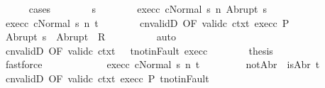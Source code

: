 \begin{isabellebody}
\ \ \ \ \isamarkupfalse%
\ {\isacharparenleft}cases{\isacharparenright}\isanewline
\ \ \ \ \ \ \isamarkupfalse%
\ s{\isacharprime}\isanewline
\ \ \ \ \ \ \isamarkupfalse%
\ exec{\isacharunderscore}c{}{\isacharcolon}\ {\isachardoublequoteopen}{\isasymGamma}{\isasymturnstile}{\isasymlangle}cNormal\ s{\isasymrangle}\ {\isacharequal}n{\isasymRightarrow}\ Abrupt\ s{\isacharprime}{\isachardoublequoteclose}\ \isanewline
\ \ \ \ \ \ \isamarkupfalse%
\ exec{\isacharunderscore}c{}{\isacharcolon}\ {\isachardoublequoteopen}{\isasymGamma}{\isasymturnstile}{\isasymlangle}cNormal\ s{\isacharprime}{\isasymrangle}\ {\isacharequal}n{\isasymRightarrow}\ t{\isachardoublequoteclose}\isanewline
\ \ \ \ \ \ \isamarkupfalse%
\ cnvalidD\ {\isacharbrackleft}OF\ valid{\isacharunderscore}c{}\ ctxt\ exec{\isacharunderscore}c{}\ P\ {\isacharbrackright}\ \isanewline
\ \ \ \ \ \ \isamarkupfalse%
\ {\isachardoublequoteopen}Abrupt\ s{\isacharprime}\ {\isasymin}\ Abrupt\ {\isacharbackquote}\ R{\isachardoublequoteclose}\isanewline
\ \ \ \ \ \ \ \ \isamarkupfalse%
\ auto\isanewline
\ \ \ \ \ \ \isamarkupfalse%
\ cnvalidD\ {\isacharbrackleft}OF\ valid{\isacharunderscore}c{}\ ctxt\ {\isacharunderscore}\ {\isacharunderscore}\ t{\isacharunderscore}notin{\isacharunderscore}Fault{\isacharbrackright}\ exec{\isacharunderscore}c{}\isanewline
\ \ \ \ \ \ \isamarkupfalse%
\ {\isacharquery}thesis\isanewline
\ \ \ \ \ \ \ \ \isamarkupfalse%
\ fastforce\isanewline
\ \ \ \ \isamarkupfalse%
\isanewline
\ \ \ \ \ \ \isamarkupfalse%
\ exec{\isacharunderscore}c{}{\isacharcolon}\ {\isachardoublequoteopen}{\isasymGamma}{\isasymturnstile}{\isasymlangle}cNormal\ s{\isasymrangle}\ {\isacharequal}n{\isasymRightarrow}\ t{\isachardoublequoteclose}\ \isanewline
\ \ \ \ \ \ \isamarkupfalse%
\ notAbr{\isacharcolon}\ {\isachardoublequoteopen}{\isasymnot}\ isAbr\ t{\isachardoublequoteclose}\isanewline
\ \ \ \ \ \ \isamarkupfalse%
\ cnvalidD\ {\isacharbrackleft}OF\ valid{\isacharunderscore}c{}\ ctxt\ exec{\isacharunderscore}c{}\ P\ t{\isacharunderscore}notin{\isacharunderscore}Fault{\isacharbrackright}\ \isanewline
\ \ \ \ \ \ \isamarkupfalse%

\end{isabellebody}
